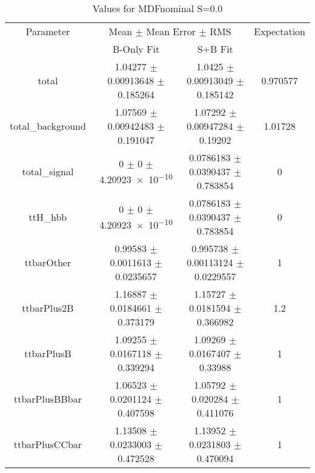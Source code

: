\begin{table}
\centering
\caption{Values for MDFnominal S=0.0}
\begin{tabular}{cccc}
\toprule
Parameter & \multicolumn{2}{c}{Mean $\pm$ Mean Error $\pm$ RMS} & Expectation\\
 & B-Only Fit & S+B Fit & \\
\midrule
total & \num{1.04277} $\pm$ \num{0.00913648} $\pm$ \num{0.185264} & \num{1.0425} $\pm$ \num{0.00913049} $\pm$ \num{0.185142} & \num{0.970577}\\
total\_background & \num{1.07569} $\pm$ \num{0.00942483} $\pm$ \num{0.191047} & \num{1.07292} $\pm$ \num{0.00947284} $\pm$ \num{0.19202} & \num{1.01728}\\
total\_signal & \num{0} $\pm$ \num{0} $\pm$ \num{4.20923e-10} & \num{0.0786183} $\pm$ \num{0.0390437} $\pm$ \num{0.783854} & \num{0}\\
ttH\_hbb & \num{0} $\pm$ \num{0} $\pm$ \num{4.20923e-10} & \num{0.0786183} $\pm$ \num{0.0390437} $\pm$ \num{0.783854} & \num{0}\\
ttbarOther & \num{0.99583} $\pm$ \num{0.0011613} $\pm$ \num{0.0235657} & \num{0.995738} $\pm$ \num{0.00113124} $\pm$ \num{0.0229557} & \num{1}\\
ttbarPlus2B & \num{1.16887} $\pm$ \num{0.0184661} $\pm$ \num{0.373179} & \num{1.15727} $\pm$ \num{0.0181594} $\pm$ \num{0.366982} & \num{1.2}\\
ttbarPlusB & \num{1.09255} $\pm$ \num{0.0167118} $\pm$ \num{0.339294} & \num{1.09269} $\pm$ \num{0.0167407} $\pm$ \num{0.33988} & \num{1}\\
ttbarPlusBBbar & \num{1.06523} $\pm$ \num{0.0201124} $\pm$ \num{0.407598} & \num{1.05792} $\pm$ \num{0.020284} $\pm$ \num{0.411076} & \num{1}\\
ttbarPlusCCbar & \num{1.13508} $\pm$ \num{0.0233003} $\pm$ \num{0.472528} & \num{1.13952} $\pm$ \num{0.0231803} $\pm$ \num{0.470094} & \num{1}\\
\bottomrule
\end{tabular}
\end{table}